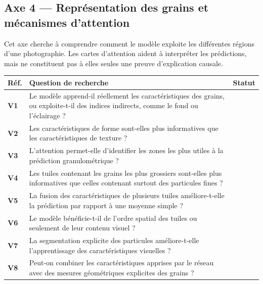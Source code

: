 \documentclass[11pt,a4paper]{article}
\makeatletter
\newenvironment{qtable}{%
  \par\smallskip
  \begin{longtable}{@{}>{\bfseries}p{1.0cm} p{12.3cm} p{1.5cm}@{}}
  \toprule
  \textbf{Réf.} & \textbf{Question de recherche} & \textbf{Statut}\\
  \midrule
  \endhead
}{%
  \bottomrule
  \end{longtable}
}
\makeatother
\begin{document}
\subsection*{Axe 4 --- Représentation des grains et mécanismes d'attention}
Cet axe cherche à comprendre comment le modèle exploite les différentes régions d'une photographie. Les cartes d'attention aident à interpréter les prédictions, mais ne constituent pas à elles seules une preuve d'explication causale.
\begin{qtable}
V1 & Le modèle apprend-il réellement les caractéristiques des grains, ou exploite-t-il des indices indirects, comme le fond ou l'éclairage ? & \\
V2 & Les caractéristiques de forme sont-elles plus informatives que les caractéristiques de texture ? & \\
V3 & L'attention permet-elle d'identifier les zones les plus utiles à la prédiction granulométrique ? & \\
V4 & Les tuiles contenant les grains les plus grossiers sont-elles plus informatives que celles contenant surtout des particules fines ? & \\
V5 & La fusion des caractéristiques de plusieurs tuiles améliore-t-elle la prédiction par rapport à une moyenne simple ? & \\
V6 & Le modèle bénéficie-t-il de l'ordre spatial des tuiles ou seulement de leur contenu visuel ? & \\
V7 & La segmentation explicite des particules améliore-t-elle l'apprentissage des caractéristiques visuelles ? & \\
V8 & Peut-on combiner les caractéristiques apprises par le réseau avec des mesures géométriques explicites des grains ? & \\
\end{qtable}
\end{document}
